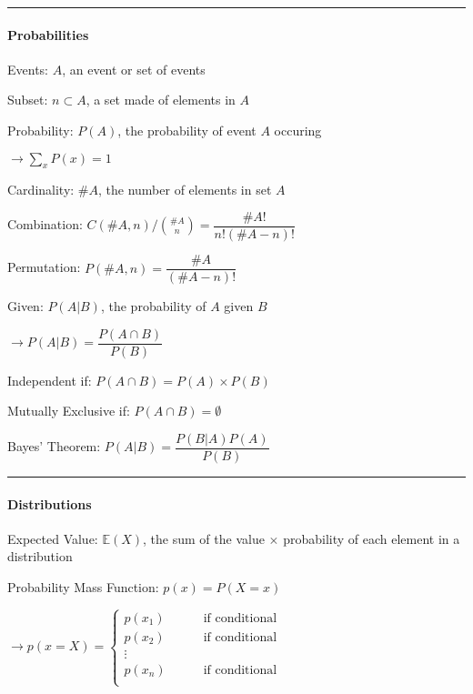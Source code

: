 \documentclass[10pt, letterpaper]{paper}
\newcommand{\horizontal}{\noindent\rule{\hsize}{0.4pt}}
\begin{document}
\begin{multicols*}{2}
        \horizontal
        
        \paragraph*{Probabilities}\mbox{}

        Events: $A$, an event or set of events

        Subset: $n \subset A$, a set made of elements in $A$

        Probability: $P(A)$, the probability of event $A$ occuring

        $\rightarrow \sum\limits_{x} P(x) = 1$

        Cardinality: $\#A$, the number of elements in set $A$

        Combination: $C(\#A, n) / {\#A \choose n} = \dfrac{\#A!}{n!(\#A-n)!}$

        Permutation: $P(\#A, n) = \dfrac{\#A}{(\#A - n)!}$

        Given: $P(A|B)$, the probability of $A$ given $B$

        $\rightarrow P(A|B) = \dfrac{P(A \cap B)}{P(B)}$

        Independent if: $P(A \cap B) = P(A) \times P(B)$

        Mutually Exclusive if: $P(A \cap B) = \emptyset$

        Bayes' Theorem: $P(A|B) = \dfrac{P(B|A)P(A)}{P(B)}$

        \horizontal

        \paragraph*{Distributions}\mbox{}

        Expected Value: $\mathbb{E}(X)$, the sum of the value $\times$ probability of each element in a distribution

        Probability Mass Function: $p(x) = P(X = x)$
        
        $\rightarrow p(x = X) = 
            \left\{
                \begin{array}{lcl}
                    p(x_{1}) & \quad & \text{ if conditional}   \\
                    p(x_{2}) & \quad & \text{ if conditional}   \\
                    \vdots
                    &&                                          \\
                    p(x_{n}) & \quad & \text{ if conditional}   \\
                \end{array}
            \right.
        $


\end{multicols*}
\end{document}
